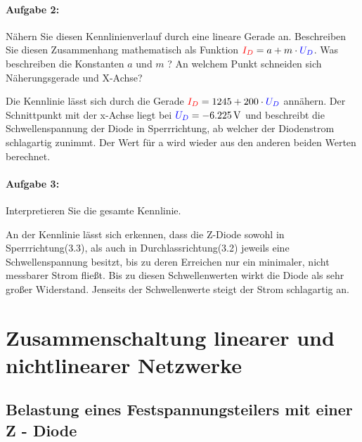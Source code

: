\documentclass[11pt,a4paper,titlepage]{scrreprt}
\begin{document}
           \subsubsection{Aufgabe 2:} Nähern Sie diesen Kennlinienverlauf durch eine lineare Gerade an. Beschreiben Sie diesen Zusammenhang mathematisch als Funktion $\textcolor{red}{I_D} = a + m \cdot \textcolor{blue}{U_D}$. Was beschreiben die Konstanten $a$ und $m$ ? An welchem Punkt schneiden sich Näherungsgerade und X-Achse?
           
Die Kennlinie lässt sich durch die Gerade $\textcolor{red}{I_D} = 1245 + 200 \cdot \textcolor{blue}{U_D}$ annähern. Der  Schnittpunkt mit der x-Achse liegt bei $\textcolor{blue}{U_D} = \SI{-6,225}{\volt}$ und beschreibt die Schwellenspannung der Diode in Sperrrichtung, ab welcher der Diodenstrom schlagartig zunimmt. Der Wert für a wird wieder aus den anderen beiden Werten berechnet.

           \subsubsection{Aufgabe 3:} Interpretieren Sie die gesamte Kennlinie.
           
           An der Kennlinie lässt sich erkennen, dass die Z-Diode sowohl in Sperrrichtung(3.3), als auch in Durchlassrichtung(3.2) jeweils eine Schwellenspannung besitzt, bis zu deren Erreichen nur ein minimaler, nicht messbarer Strom fließt. Bis zu diesen Schwellenwerten wirkt die Diode als sehr großer Widerstand. Jenseits der Schwellenwerte steigt der Strom schlagartig an.


    \chapter{Zusammenschaltung linearer und nichtlinearer Netzwerke}


        \section{Belastung eines Festspannungsteilers mit einer Z - Diode}
\end{document}

